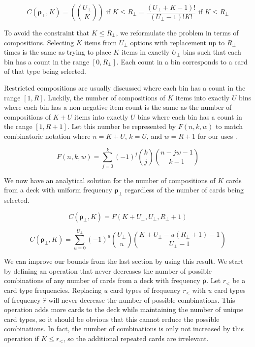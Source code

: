 \documentclass{article}
\begin{document}
\begin{equation}
    C(\bm{\rho_{\bot}}, K) = \left (\binom{U_{\bot}}{K}\right) \text{ if } K \leq R_{\bot} = \frac{(U_{\bot} + K - 1)!}{(U_{\bot} - 1)!K!} \text{ if } K \leq R_{\bot}
\end{equation}

To avoid the constraint that $K\leq R_{\bot}$, we reformulate the problem in terms of compositions. Selecting $K$ items from $U_{\bot}$ options with replacement up to $R_\bot$ times is the same as trying to place $K$ items in exactly $U_{\bot}$ bins such that each bin has a count in the range $[0, R_{\bot}]$. Each count in a bin corresponds to a card of that type being selected.

Restricted compositions are usually discussed where each bin has a count in the range $[1, R]$. Luckily, the number of compositions of $K$ items into exactly $U$ bins where each bin has a non-negative item count is the same as the number of compositions of $K + U$ items into exactly $U$ bins where each bin has a count in the range $[1, R + 1]$. Let this number be represented by $F(n, k, w)$ to match combinatoric notation where $n = K + U$, $k = U$, and $w = R + 1$ for our uses \cite{abramson}.

\begin{equation}
    F(n, k, w) = \sum_{j = 0}^k(-1)^j \binom{k}{j}\binom{n - jw - 1}{k - 1}
\end{equation}

We now have an analytical solution for the number of compositions of $K$ cards from a deck with uniform frequency $\bm{\rho_{\bot}}$ regardless of the number of cards being selected.

\begin{equation}
    C(\bm{\rho_\bot}, K) = F(K + U_\bot, U_\bot, R_\bot + 1)
\end{equation}

\begin{equation}
    C(\bm{\rho_\bot}, K) = \sum_{u = 0}^{U_\bot}(-1)^u \binom{U_\bot}{u}\binom{K + U_\bot - u(R_\bot + 1) - 1}{U_\bot - 1}
\end{equation}

We can improve our bounds from the last section by using this result. We start by defining an operation that never decreases the number of possible combinations of any number of cards from a deck with frequency $\bm{\rho}$. Let $r_<$ be a card type frequencies. Replacing $u$ card types of frequency $r_<$ with $u$ card types of frequency $\hat{r}$ will never decrease the number of possible combinations. This operation adds more cards to the deck while maintaining the number of unique card types, so it should be obvious that this cannot reduce the possible combinations. In fact, the number of combinations is only not increased by this operation if $K \leq r_<$, so the additional repeated cards are irrelevant.
\end{document}

